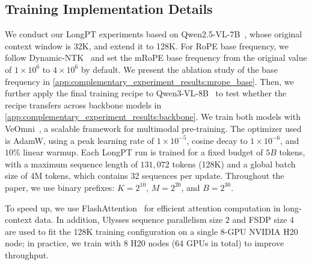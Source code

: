 \subsection{Training Implementation Details}
\label{app:final_recipe:implementation_details}
We conduct our LongPT experiments based on Qwen2.5-VL-7B~\citep{bai2025qwen2}, whose original context window is 32K, and extend it to 128K.
For RoPE base frequency, we follow Dynamic-NTK~\citep{dynamicntk} and set the mRoPE base frequency from the original value of $1\times 10^6$ to $4\times 10^6$ by default.
We present the ablation study of the base frequency in \cref{app:complementary_experiment_results:mrope_base}.
Then, we further apply the final training recipe to Qwen3-VL-8B~\citep{bai2025qwen3} to test whether the recipe transfers across backbone models in \cref{app:complementary_experiment_results:backbone}.
We train both models with VeOmni~\citep{ma2025veomni}, a scalable framework for multimodal pre-training.
The optimizer used is AdamW, using a peak learning rate of $1\times10^{-5}$, cosine decay to $1\times10^{-6}$, and $10\%$ linear warmup.
Each LongPT run is trained for a fixed budget of $5B$ tokens, with a maximum sequence length of $131{,}072$ tokens (128K) and a global batch size of 4M tokens, which contains 32 sequences per update.
Throughout the paper, we use binary prefixes: $K=2^{10}$, $M=2^{20}$, and $B=2^{30}$.

To speed up, we use FlashAttention~\citep{daoflashattention} for efficient attention computation in long-context data. In addition, Ulysses sequence parallelism size $2$ and FSDP size $4$ are used to fit the 128K training configuration on a single 8-GPU NVIDIA H20 node; in practice, we train with 8 H20 nodes (64 GPUs in total) to improve throughput.

